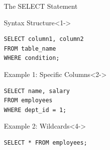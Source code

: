 \documentclass[aspectratio=169,11pt]{beamer}
\begin{document}
\begin{frame}[fragile]{The SELECT Statement}
\begin{block}{Syntax Structure}<1->
\begin{lstlisting}
SELECT column1, column2
FROM table_name
WHERE condition;
\end{lstlisting}
\end{block}

\pause
\begin{exampleblock}{Example 1: Specific Columns}<2->
\begin{lstlisting}
SELECT name, salary
FROM employees
WHERE dept_id = 1;
\end{lstlisting}
\end{exampleblock}

\pause
\begin{exampleblock}{Example 2: Wildcards}<4->
\begin{lstlisting}
SELECT * FROM employees;
\end{lstlisting}
\end{exampleblock}
\end{frame}

\end{document}
